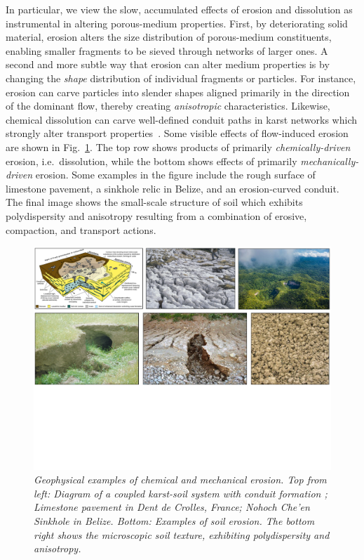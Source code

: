\documentclass[11pt]{article}
\begin{document}
In particular, we view the slow, accumulated effects of erosion and dissolution as instrumental in altering porous-medium properties. First, by deteriorating solid material, erosion alters the size distribution of porous-medium constituents, enabling smaller fragments to be sieved through networks of larger ones. A second and more subtle way that erosion can alter medium properties is by changing the {\em shape} distribution of individual fragments or particles. For instance, erosion can carve particles into slender shapes aligned primarily in the direction of the dominant flow, thereby creating {\em anisotropic} characteristics. Likewise, chemical dissolution can carve well-defined conduit paths in karst networks which strongly alter transport properties~\cite{szymczak2009wormhole}. Some visible effects of flow-induced erosion are shown in Fig.~\ref{collage}. The top row shows products of primarily {\em chemically-driven} erosion, i.e.~dissolution, while the bottom shows effects of primarily {\em mechanically-driven} erosion. Some examples in the figure include the rough surface of limestone pavement, a sinkhole relic in Belize, and an erosion-curved conduit. The final image shows the small-scale structure of soil which exhibits polydispersity and anisotropy resulting from a combination of erosive, compaction, and transport actions.

\begin{figure}%
\begin{center}
\includegraphics[width = 0.99 \textwidth]{./figs/collage.pdf}
\caption{\label{collage} \em Geophysical examples of chemical and mechanical erosion. Top from left: Diagram of a coupled karst-soil system with conduit formation \cite{watson2019sinkholes}; Limestone pavement in Dent de Crolles, France; Nohoch Che'en Sinkhole in Belize. Bottom: Examples of soil erosion. The bottom right shows the microscopic soil texture, exhibiting polydispersity and anisotropy.}
\end{center}
\end{figure}
\end{document}
